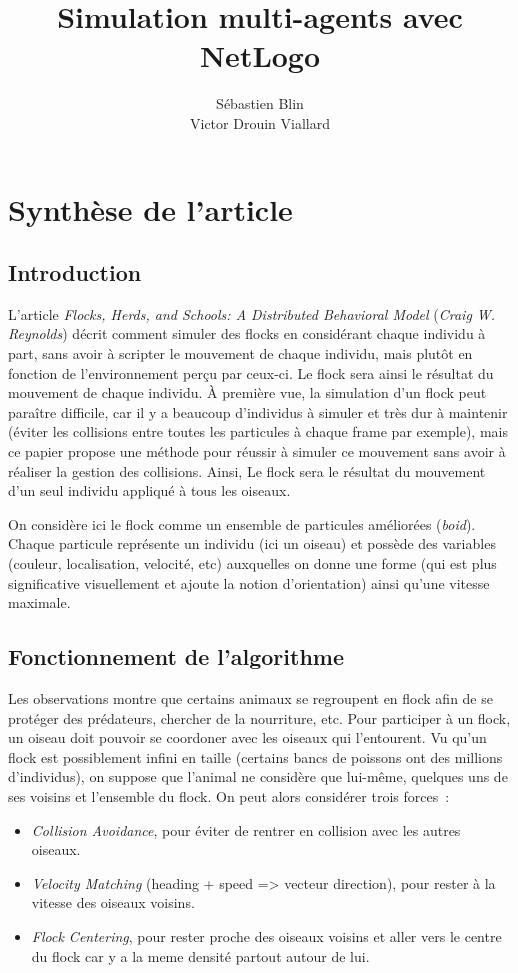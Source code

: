 \documentclass{article}
\title{Simulation multi-agents avec NetLogo}
\author{Sébastien Blin\\Victor Drouin Viallard}
\begin{document}
\maketitle

\section{Synthèse de l'article}
\subsection{Introduction}
L'article \emph{Flocks, Herds, and Schools: A Distributed Behavioral Model} (\emph{Craig W. Reynolds}) décrit comment simuler des flocks en considérant chaque individu à part, sans avoir à scripter le mouvement de chaque individu, mais plutôt en fonction de l'environnement perçu par ceux-ci. Le flock sera ainsi le résultat du mouvement de chaque individu. À première vue, la simulation d'un flock peut paraître difficile, car il y a beaucoup d'individus à simuler et très dur à maintenir (éviter les collisions entre toutes les particules à chaque frame par exemple), mais ce papier propose une méthode pour réussir à simuler ce mouvement sans avoir à réaliser la gestion des collisions. Ainsi, Le flock sera le résultat du mouvement d'un seul individu appliqué à tous les oiseaux.

On considère ici le flock comme un ensemble de particules améliorées (\emph{boid}). Chaque particule représente un individu (ici un oiseau) et possède des variables (couleur, localisation, velocité, etc) auxquelles on donne une forme (qui est plus significative visuellement et ajoute la notion d'orientation) ainsi qu'une vitesse maximale.

\subsection{Fonctionnement de l'algorithme}
Les observations montre que certains animaux se regroupent en flock afin de se protéger des prédateurs, chercher de la nourriture, etc. Pour participer à un flock, un oiseau doit pouvoir se coordoner avec les oiseaux qui l'entourent. Vu qu'un flock est possiblement infini en taille (certains bancs de poissons ont des millions d'individus), on suppose que l'animal ne considère que lui-même, quelques uns de ses voisins et l'ensemble du flock. On peut alors considérer trois forces~:

\begin{itemize}
  \item \emph{Collision Avoidance}, pour éviter de rentrer en collision avec les autres oiseaux.
  \item \emph{Velocity Matching} (heading + speed => vecteur direction), pour rester à la vitesse des oiseaux voisins.
  \item \emph{Flock Centering}, pour rester proche des oiseaux voisins et aller vers le centre du flock car y a la meme densité partout autour de lui.
\end{itemize}
\end{document}
